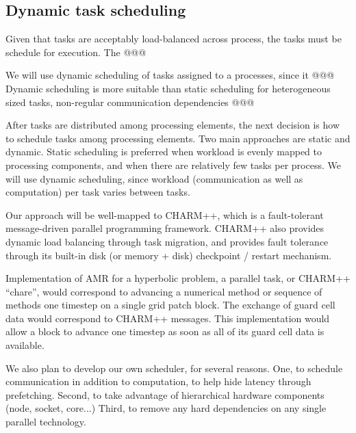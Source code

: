 \documentclass[14pt,letter]{article}
\begin{document}
\subsection{Dynamic task scheduling} \label{ss:scheduling}

Given that tasks are acceptably load-balanced across process, the
tasks must be schedule for execution.  The @@@


We will use dynamic scheduling of tasks assigned to a processes, since
it @@@  Dynamic scheduling is more suitable than static scheduling for
heterogeneous sized tasks, non-regular communication dependencies @@@


After tasks are distributed among processing elements, the next
decision is how to schedule tasks among processing elements.  Two main
approaches are static and dynamic.  Static scheduling is preferred
when workload is evenly mapped to processing components, and when
there are relatively few tasks per process.  We will use dynamic
scheduling, since workload (communication as well as computation) per
task varies between tasks.

Our approach will be well-mapped to CHARM++,
which is a fault-tolerant message-driven parallel programming
framework.  CHARM++ also provides dynamic load balancing through task
migration, and provides fault tolerance through its built-in disk (or
memory + disk) checkpoint / restart mechanism.

Implementation of AMR for a hyperbolic problem, a parallel task, or
CHARM++ ``chare'', would correspond to advancing a numerical method or
sequence of methods one timestep on a single grid patch block.  The
exchange of guard cell data would correspond to CHARM++ messages.
This implementation would allow a block to advance one timestep as
soon as all of its guard cell data is available.


We also plan to develop our own scheduler, for several reasons.  One,
to schedule communication in addition to computation, to help hide
latency through prefetching.  Second, to take advantage of
hierarchical hardware components (node, socket, core...)  Third, to
remove any hard dependencies on any single parallel technology.
\end{document}
